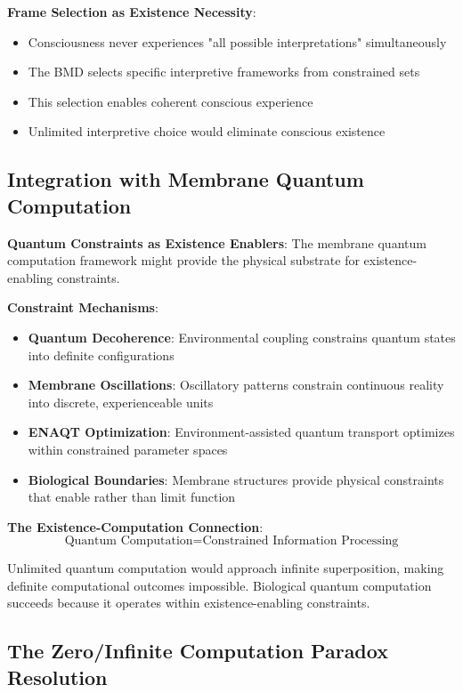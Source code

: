 \documentclass[12pt]{article}
\begin{document}
\textbf{Frame Selection as Existence Necessity}:
\begin{itemize}
\item Consciousness never experiences "all possible interpretations" simultaneously
\item The BMD selects specific interpretive frameworks from constrained sets
\item This selection enables coherent conscious experience
\item Unlimited interpretive choice would eliminate conscious existence
\end{itemize}

\subsection{Integration with Membrane Quantum Computation}

\textbf{Quantum Constraints as Existence Enablers}: The membrane quantum computation framework might provide the physical substrate for existence-enabling constraints.

\textbf{Constraint Mechanisms}:
\begin{itemize}
\item \textbf{Quantum Decoherence}: Environmental coupling constrains quantum states into definite configurations
\item \textbf{Membrane Oscillations}: Oscillatory patterns constrain continuous reality into discrete, experienceable units
\item \textbf{ENAQT Optimization}: Environment-assisted quantum transport optimizes within constrained parameter spaces
\item \textbf{Biological Boundaries}: Membrane structures provide physical constraints that enable rather than limit function
\end{itemize}

\textbf{The Existence-Computation Connection}:
$$\text{Quantum Computation} = \text{Constrained Information Processing}$$

Unlimited quantum computation would approach infinite superposition, making definite computational outcomes impossible. Biological quantum computation succeeds because it operates within existence-enabling constraints.

\subsection{The Zero/Infinite Computation Paradox Resolution}
\end{document}
